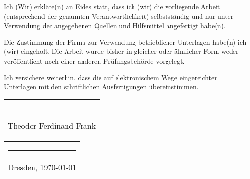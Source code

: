 \documentclass[../main.tex]{subfiles}
\begin{document}
        Ich (Wir) erkläre(n) an Eides statt, dass ich (wir) die vorliegende Arbeit (entsprechend
	der genannten Verantwortlichkeit) selbstständig und nur unter Verwendung der angegebenen
	Quellen und Hilfsmittel angefertigt habe(n).
	\medskip

	Die Zustimmung der Firma zur Verwendung betrieblicher Unterlagen habe(n) ich (wir)
	eingeholt. Die Arbeit wurde bisher in gleicher oder ähnlicher Form weder
	veröffentlicht noch einer anderen Prüfungsbehörde vorgelegt.
	\medskip

	Ich versichere weiterhin, dass die auf elektronischem Wege eingereichten Unterlagen
	mit den schriftlichen Ausfertigungen übereinstimmen.

	\vspace{15mm}
	\hfill%
	\begin{tabular}[t]{c}
		\rule{10em}{0.4pt}      \\
		Theodor Ferdinand Frank
	\end{tabular}%
	\hfill%
	\begin{tabular}[t]{c}
		\rule{10em}{0.4pt} \\
		Dresden, \today
	\end{tabular}%
	\hfill\strut
\end{document}
